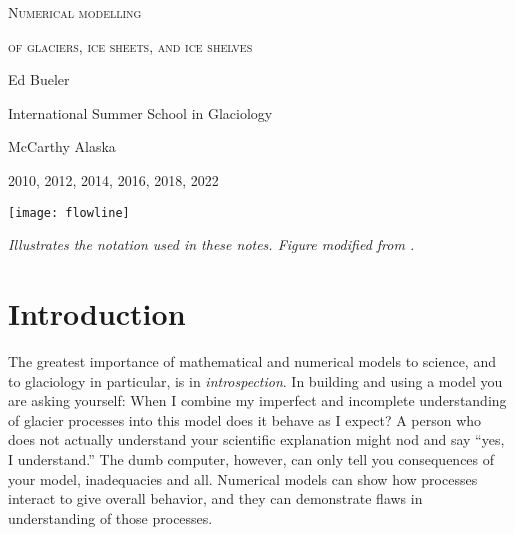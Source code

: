 \documentclass[letterpaper,final,12pt,reqno]{amsart}
\begin{document}
\graphicspath{{../figures/}}

\begin{titlepage}

  \begin{center}
  \phantom{foo}
    \vspace{1.0cm}

     {\Large \textsc{Numerical modelling}}
    \vspace{0.7cm}

     {\Large \textsc{of glaciers, ice sheets, and ice shelves}}

    \vspace{1.5cm}

    {\large Ed Bueler}
    \vspace{1cm}

    International Summer School in Glaciology

    McCarthy Alaska

    2010, 2012, 2014, 2016, 2018, 2022

    \vfill
    
    \texttt{[image: flowline]}
  
    \scriptsize \emph{Illustrates the notation used in these notes.  Figure modified from \cite{SchoofMarine1}.} \normalsize
    
    \vspace{1.5in}
  \end{center}
\end{titlepage}

\clearpage\newpage

\setcounter{page}{2}
\section{Introduction}  \label{sec:intro}

The greatest importance of mathematical and numerical models to science, and to glaciology in particular, is in \emph{introspection}.  In building and using a model you are asking yourself: When I combine my imperfect and incomplete understanding of glacier processes into this model does it behave as I expect?  A person who does not actually understand your scientific explanation might nod and say ``yes, I understand.''  The dumb computer, however, can only tell you consequences of your model, inadequacies and all.  Numerical models can show how processes interact to give overall behavior, and they can demonstrate flaws in understanding of those processes.
\end{document}

